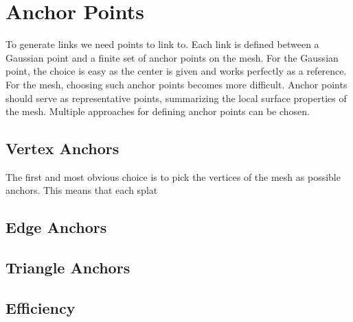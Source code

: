 \section{Anchor Points}

To generate links we need points to link to. Each link is defined between a Gaussian point and a finite set of anchor points on the mesh. For the Gaussian point, the choice is easy as the center is given and works perfectly as a reference. For the mesh, choosing such anchor points becomes more difficult. Anchor points should serve as representative points, summarizing the local surface properties of the mesh. Multiple approaches for defining anchor points can be chosen.

\subsection{Vertex Anchors}

The first and most obvious choice is to pick the vertices of the mesh as possible anchors. This means that each splat

\subsection{Edge Anchors}

\subsection{Triangle Anchors}

\subsection{Efficiency}
